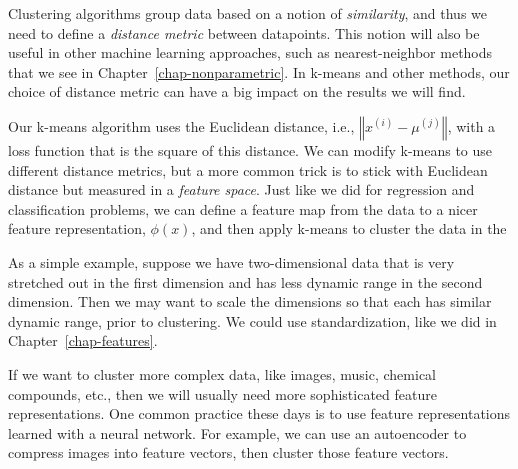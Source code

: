 Clustering algorithms group data based on a notion of
\textit{similarity}, and thus we need to define a \textit{distance metric}
between datapoints. This notion
will also be useful in other machine learning approaches,
such as nearest-neighbor methods that we see in Chapter~\ref{chap-nonparametric}.
In k-means and other methods, our choice of distance
metric can have a big impact on the results we will find.

Our k-means algorithm uses the Euclidean distance, i.e., $\left\Vert
  x^{(i)} - \mu^{(j)} \right\Vert$, with a loss function that is the
square of this distance. We can modify k-means to use different
distance metrics, but a more common trick is to stick with Euclidean
distance but measured in a \textit{feature space}. Just like we did
for regression and classification problems, we can define a feature
map from the data to a nicer feature representation, $\phi(x)$, and
then apply k-means to cluster the data in the

As a simple example, suppose we have two-dimensional data that is very
stretched out in the first dimension and has less dynamic range in the
second dimension. Then we may want to scale the dimensions so that
each has similar dynamic range, prior to clustering. We could use
standardization, like we did in Chapter~\ref{chap-features}.

If we want to cluster more complex data, like images, music, chemical
compounds, etc., then we will usually need more sophisticated feature
representations. One common practice these days is to use feature
representations learned with a neural network. For example, we can use
an autoencoder to compress images into feature vectors, then cluster
those feature vectors.



